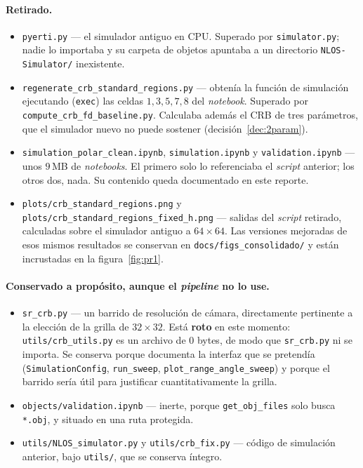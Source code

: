 \documentclass[11pt,a4paper]{article}
\newcommand{\code}[1]{\texttt{#1}}
\theoremstyle{definition}
\begin{document}
\paragraph{Retirado.}
\begin{itemize}[leftmargin=*]
  \item \code{pyerti.py} --- el simulador antiguo en CPU. Superado por
        \code{simulator.py}; nadie lo importaba y su carpeta de objetos apuntaba
        a un directorio \code{NLOS-Simulator/} inexistente.
  \item \code{regenerate\_crb\_standard\_regions.py} --- obtenía la función de
        simulación ejecutando (\code{exec}) las celdas $1,3,5,7,8$ del
        \emph{notebook}. Superado por \code{compute\_crb\_fd\_baseline.py}.
        Calculaba además el CRB de tres parámetros, que el simulador nuevo no
        puede sostener (decisión~\ref{dec:2param}).
  \item \code{simulation\_polar\_clean.ipynb}, \code{simulation.ipynb} y
        \code{validation.ipynb} --- unos $9\,$MB de \emph{notebooks}. El primero
        solo lo referenciaba el \emph{script} anterior; los otros dos, nada. Su
        contenido queda documentado en este reporte.
  \item \code{plots/crb\_standard\_regions.png} y
        \code{plots/crb\_standard\_regions\_fixed\_h.png} --- salidas del
        \emph{script} retirado, calculadas sobre el simulador antiguo a
        $64\times64$. Las versiones mejoradas de esos mismos resultados se
        conservan en \code{docs/figs\_consolidado/} y están incrustadas en la
        figura~\ref{fig:pr1}.
\end{itemize}

\paragraph{Conservado a propósito, aunque el \emph{pipeline} no lo use.}
\begin{itemize}[leftmargin=*]
  \item \code{sr\_crb.py} --- un barrido de resolución de cámara, directamente
        pertinente a la elección de la grilla de $32\times32$. Está
        \textbf{roto} en este momento: \code{utils/crb\_utils.py} es un archivo
        de $0$ bytes, de modo que \code{sr\_crb.py} ni se importa. Se conserva
        porque documenta la interfaz que se pretendía
        (\code{SimulationConfig}, \code{run\_sweep},
        \code{plot\_range\_angle\_sweep}) y porque el barrido sería útil para
        justificar cuantitativamente la grilla.
  \item \code{objects/validation.ipynb} --- inerte, porque
        \code{get\_obj\_files} solo busca \code{*.obj}, y situado en una ruta
        protegida.
  \item \code{utils/NLOS\_simulator.py} y \code{utils/crb\_fix.py} --- código de
        simulación anterior, bajo \code{utils/}, que se conserva íntegro.
\end{itemize}
\end{document}
